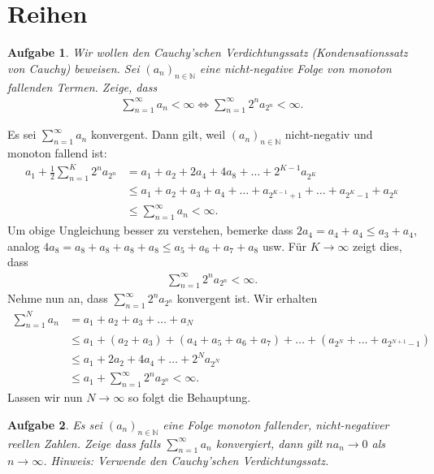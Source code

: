 \documentclass[a4paper, 20]{exam}
\newtheorem{ex}{Aufgabe}
\begin{document}
\newpage
\section{Reihen}

\begin{ex} Wir wollen den Cauchy'schen Verdichtungssatz (Kondensationssatz von Cauchy) beweisen. 
Sei $(a_n)_{n \in \mathbb{N}}$ eine nicht-negative Folge von monoton fallenden Termen. Zeige, dass 
\begin{align*}
\sum_{n=1}^\infty a_n < \infty \iff \sum_{n=1}^\infty 2^n a_{2^n} < \infty.
\end{align*}
\end{ex}

\begin{solution} Es sei $\sum_{n=1}^\infty a_n$ konvergent. Dann gilt, weil $(a_n)_{n \in \mathbb{N}}$ nicht-negativ und monoton fallend ist:
\begin{align*}
a_1 + \frac{1}{2} \sum_{n=1}^K 2^n a_{2^n} &= a_1 + a_2 + 2a_4 + 4 a_8 + \dots + 2^{K-1} a_{2^K} \\
& \leq a_1 + a_2 + a_3 + a_4 + \dots + a_{2^{K-1}+1} + \dots + a_{2^K-1} + a_{2^K} \\
& \leq \sum_{n=1}^\infty a_n < \infty. 
\end{align*}
Um obige Ungleichung besser zu verstehen,  bemerke dass $2a_4 = a_4 + a_4 \leq a_3 + a_4$, analog $4a_8=a_8 + a_8 + a_8 + a_8 \leq a_5 + a_6 + a_7 + a_8$ usw. Für $K \to \infty$ zeigt dies, dass 
\begin{align*}
\sum_{n=1}^\infty 2^n a_{2^n} < \infty. 
\end{align*}
Nehme nun an, dass $\sum_{n=1}^\infty 2^n a_{2^n}$ konvergent ist. Wir erhalten 
\begin{align*}
\sum_{n=1}^N a_n& = a_1 +a_2 + a_3 + \dots + a_N \\
& \leq a_1 + (a_2 + a_3) + (a_4 + a_5 + a_6 + a_7) + \dots + (a_{2^N} + \dots + a_{2^{N+1}-1}) \\ 
& \leq a_1 +2 a_2 + 4a_4 + \dots + 2^N a_{2^N} \\
& \leq a_1 + \sum_{n=1}^\infty 2^n a_{2^n}< \infty.
\end{align*}
Lassen wir nun $N \to \infty$ so folgt die Behauptung. 
\end{solution}

\begin{ex}\label{ex:Olivier} Es sei $(a_n)_{n \in \mathbb{N}}$ eine Folge monoton fallender, nicht-negativer reellen Zahlen. Zeige dass falls $\sum_{n=1}^\infty a_n $ konvergiert, dann gilt $n a_n \to 0$ als $n \to \infty$. Hinweis: Verwende den Cauchy'schen Verdichtungssatz. 
\end{ex}
\end{document}
